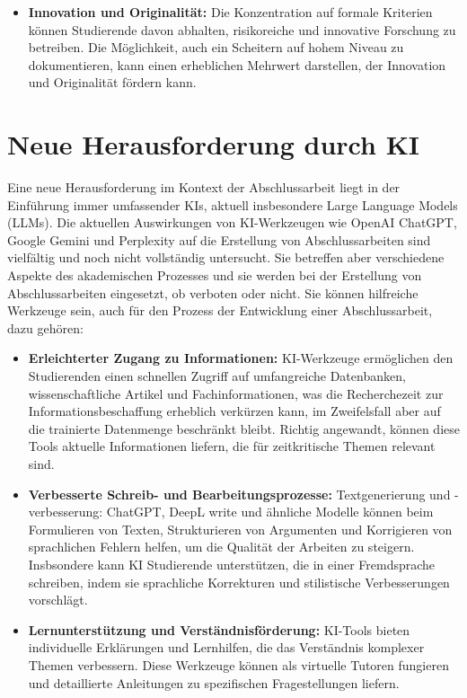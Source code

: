 \documentclass[conference]{IEEEtran}
\begin{document}
\begin{itemize}[leftmargin=*]
    \item \textbf{Innovation und Originalität:}
    \newline Die Konzentration auf formale Kriterien können Studierende davon abhalten, risikoreiche und innovative Forschung zu betreiben. Die Möglichkeit, auch ein Scheitern auf hohem Niveau zu dokumentieren, kann einen erheblichen Mehrwert darstellen, der Innovation und Originalität fördern kann.
\end{itemize}

\section{Neue Herausforderung durch KI}

Eine neue Herausforderung im Kontext der Abschlussarbeit liegt in der Einführung immer umfassender KIs, aktuell insbesondere Large Language Models (LLMs). Die aktuellen Auswirkungen von KI-Werkzeugen wie OpenAI ChatGPT, Google Gemini und Perplexity auf die Erstellung von Abschlussarbeiten sind vielfältig und  noch nicht vollständig untersucht. Sie betreffen aber verschiedene Aspekte des akademischen Prozesses und sie werden bei der Erstellung von Abschlussarbeiten eingesetzt, ob verboten oder nicht. Sie können hilfreiche Werkzeuge sein, auch für den Prozess der Entwicklung einer Abschlussarbeit, dazu gehören:

\begin{itemize}[leftmargin=*]
    \item \textbf{Erleichterter Zugang zu Informationen:}
    \newline KI-Werkzeuge ermöglichen den Studierenden einen schnellen Zugriff auf umfangreiche Datenbanken, wissenschaftliche Artikel und Fachinformationen, was die Recherchezeit zur Informationsbeschaffung erheblich verkürzen kann, im Zweifelsfall aber auf die trainierte Datenmenge beschränkt bleibt.
    \newline Richtig angewandt, können diese Tools  aktuelle Informationen liefern, die für zeitkritische Themen relevant sind.

    \item \textbf{Verbesserte Schreib- und Bearbeitungsprozesse:}
    \newline Textgenerierung und -verbesserung: ChatGPT, DeepL write und ähnliche Modelle können beim Formulieren von Texten, Strukturieren von Argumenten und Korrigieren von sprachlichen Fehlern helfen, um  die Qualität der Arbeiten zu steigern.
    \newline Insbsondere kann  KI  Studierende unterstützen, die in einer Fremdsprache schreiben, indem sie sprachliche Korrekturen und stilistische Verbesserungen vorschlägt.

    \item \textbf{Lernunterstützung und Verständnisförderung:}
    \newline KI-Tools bieten individuelle Erklärungen und Lernhilfen, die das Verständnis komplexer Themen verbessern.
    \newline Diese Werkzeuge können als virtuelle Tutoren fungieren und detaillierte Anleitungen zu spezifischen Fragestellungen liefern.
\end{itemize}
\end{document}
